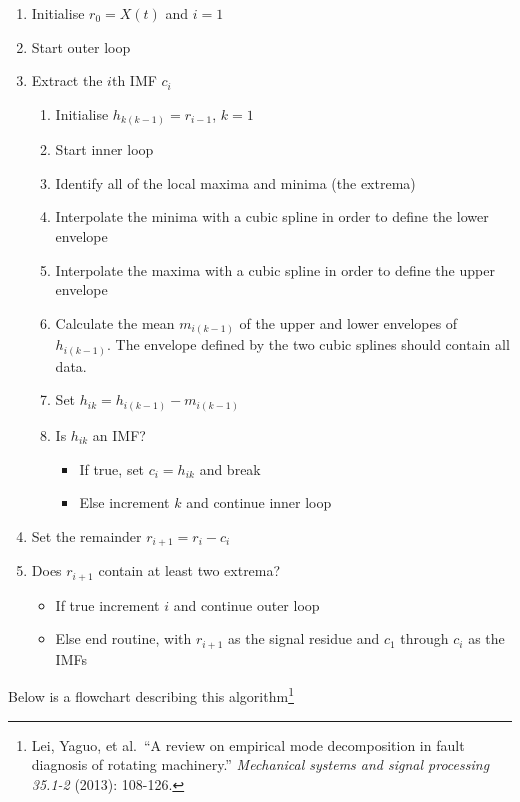 \documentclass[
  paper=a4,
  ,captions=tableheading
]{scrartcl}
\begin{document}
\begin{enumerate}
	\item Initialise \(r_0 = X(t)\) and \(i = 1\)
	\item Start outer loop 
	\item Extract the \(i\)th IMF \(c_i\)
	\begin{enumerate}
		\item Initialise \(h_{k(k-1)} = r_{i-1}\), \(k = 1\)
		\item Start inner loop
		\item Identify all of the local maxima and minima (the extrema)
		\item Interpolate the minima with a cubic spline in order to define the lower envelope
		\item Interpolate the maxima with a cubic spline in order to define the upper envelope
		\item Calculate the mean \(m_{i(k-1)}\) of the upper and lower envelopes of \(h_{i(k-1)}\). The envelope defined by the two cubic splines should contain all data.
		\item Set \(h_{ik} = h_{i(k-1)} - m_{i(k-1)}\)
		\item Is \(h_{ik}\) an IMF? 
		\begin{itemize}
			\item If true, set \(c_i = h_{ik}\) and break 
			\item Else increment \(k\) and continue inner loop
		\end{itemize}
	\end{enumerate}
	\item Set the remainder \(r_{i+1} = r_i - c_i\)
	\item Does \(r_{i + 1}\) contain at least two extrema?
	\begin{itemize}
		\item If true increment \(i\) and continue outer loop
		\item Else end routine, with \(r_{i + 1}\) as the signal residue and \(c_1\) through \(c_i\) as the IMFs
	\end{itemize}
\end{enumerate}

Below is a flowchart describing this algorithm\footnote{Lei, Yaguo, et
  al.~``A review on empirical mode decomposition in fault diagnosis of
  rotating machinery.'' \emph{Mechanical systems and signal processing
  35.1-2} (2013): 108-126.}
\end{document}
